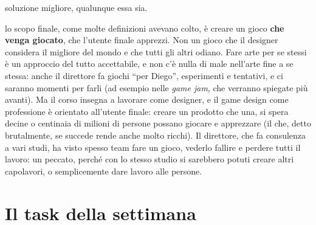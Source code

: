 \begin{description}
        soluzione migliore, qualunque essa sia.
  \item[Il design è guidato dagli utenti] lo scopo finale, come molte
        definizioni avevano colto, è creare un gioco \textbf{che venga
        giocato}, che l'utente finale apprezzi. Non un gioco che il designer
        considera il migliore del mondo e che tutti gli altri odiano. Fare arte
        per se stessi è un approccio del tutto accettabile, e non c'è nulla di
        male nell'arte fine a se stessa: anche il direttore fa giochi ``per
        Diego'', esperimenti e tentativi, e ci saranno momenti per farli (ad
        esempio nelle \emph{game jam}, che verranno spiegate più avanti). Ma il
        corso insegna a lavorare come designer, e il game design come
        professione è orientato all'utente finale: creare un prodotto che una,
        si spera decine o centinaia di milioni di persone possano giocare e
        apprezzare (il che, detto brutalmente, se succede rende anche molto
        ricchi). Il direttore, che fa consulenza a vari studi, ha visto spesso
        team fare un gioco, vederlo fallire e perdere tutti il lavoro: un
        peccato, perché con lo stesso studio si sarebbero potuti creare altri
        capolavori, o semplicemente dare lavoro alle persone.
\end{description}

\section{Il task della settimana}
\label{sec:task-gd2}

